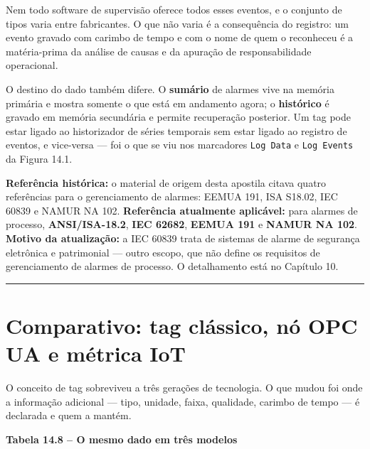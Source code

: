 Nem todo software de supervisão oferece todos esses eventos, e o conjunto de tipos varia entre
fabricantes. O que não varia é a consequência do registro: um evento gravado com carimbo de tempo e
com o nome de quem o reconheceu é a matéria-prima da análise de causas e da apuração de
responsabilidade operacional.

O destino do dado também difere. O \textbf{sumário} de alarmes vive na memória primária e mostra somente
o que está em andamento agora; o \textbf{histórico} é gravado em memória secundária e permite recuperação
posterior. Um tag pode estar ligado ao historizador de séries temporais sem estar ligado ao registro
de eventos, e vice-versa --- foi o que se viu nos marcadores \passthrough{\lstinline!Log Data!} e \passthrough{\lstinline!Log Events!} da
Figura 14.1.

\begin{caixanota}

\textbf{Referência histórica:} o material de origem desta apostila citava quatro referências para o
gerenciamento de alarmes: EEMUA 191, ISA S18.02, IEC 60839 e NAMUR NA 102.
\textbf{Referência atualmente aplicável:} para alarmes de processo, \textbf{ANSI/ISA-18.2}, \textbf{IEC 62682},
\textbf{EEMUA 191} e \textbf{NAMUR NA 102}. \textbf{Motivo da atualização:} a IEC 60839 trata de sistemas de
alarme de segurança eletrônica e patrimonial --- outro escopo, que não define os requisitos de
gerenciamento de alarmes de processo. O detalhamento está no Capítulo 10.

\end{caixanota}

\begin{center}\rule{0.5\linewidth}{0.5pt}\end{center}

\section{Comparativo: tag clássico, nó OPC UA e métrica IoT}\label{comparativo-tag-cluxe1ssico-nuxf3-opc-ua-e-muxe9trica-iot}

O conceito de tag sobreviveu a três gerações de tecnologia. O que mudou foi onde a informação
adicional --- tipo, unidade, faixa, qualidade, carimbo de tempo --- é declarada e quem a mantém.

\textbf{Tabela 14.8 -- O mesmo dado em três modelos}

